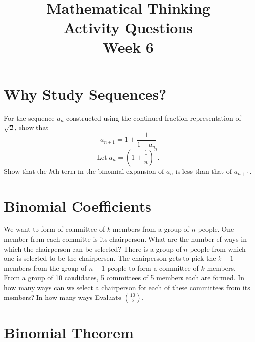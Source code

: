 \documentclass[12pt, answers, a4paper]{exam}
\title{\begin{framed}
    \textbf{Mathematical Thinking}\\Activity Questions\\Week 6
\end{framed}}
\date{}
\begin{document}
\maketitle

\setlength{\rightpointsmargin}{5pt}
\marginpointname{ \points}
\marksnotpoints
{}
\pointsinrightmargin

\unframedsolutions
\section{Why Study Sequences?}
\begin{questions}
\question For the sequence $a_n$ constructed using the continued fraction representation of $\sqrt{2}$, show that
\begin{equation*}
    a_{n+1} = 1 + \frac{1}{1+a_n}
\end{equation*}
\question 
\begin{equation*}
    \text{Let } a_n = \left( 1 + \frac{1}{n} \right)^n.
\end{equation*}
Show that the $k$th term in the binomial expansion of $a_n$ is less than that of $a_{n+1}$.
\end{questions}
  \section{Binomial Coefficients}
\begin{questions}
    \question We want to form of committee of $k$ members from a group of $n$ people. One member from each committe is its chairperson. What are the number of ways in which the chairperson can be selected?
    \question There is a group of $n$ people from which one is selected to be the chairperson. The chairperson gets to pick the $k-1$ members from the group of $n-1$ people to form a committee of $k$ members.  
    \question From a group of 10 candidates, 5 committees of 5 members each are formed. In how many ways can we select a chairperson for each of these committees from its members?
    \question In how many ways
\question Evaluate $10\choose{5}$.

\end{questions}
\section{Binomial Theorem}
\begin{questions}
    
\end{questions}
\end{document}
